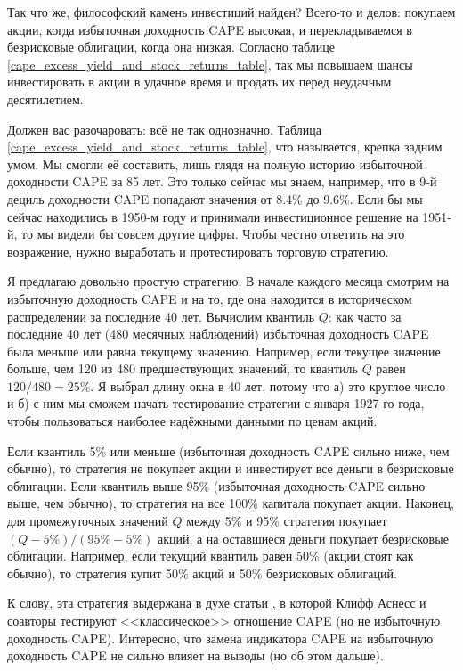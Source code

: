 Так что же, философский камень инвестиций найден? Всего-то и делов: покупаем акции, когда избыточная доходность CAPE высокая, и перекладываемся в безрисковые облигации, когда она низкая. Согласно таблице \ref{cape_excess_yield_and_stock_returns_table}, так мы повышаем шансы инвестировать в акции в удачное время и продать их перед неудачным десятилетием.

Должен вас разочаровать: всё не так однозначно. Таблица \ref{cape_excess_yield_and_stock_returns_table}, что называется, крепка задним умом. Мы смогли её составить, лишь глядя на полную историю избыточной доходности CAPE за 85 лет. Это только сейчас мы знаем, например, что в 9-й дециль доходности CAPE попадают значения от 8.4\% до 9.6\%. Если бы мы сейчас находились в 1950-м году и принимали инвестиционное решение на 1951-й, то мы видели бы совсем другие цифры. Чтобы честно ответить на это возражение, нужно выработать и протестировать торговую стратегию.

Я предлагаю довольно простую стратегию. В начале каждого месяца смотрим на избыточную доходность CAPE и на то, где она находится в историческом распределении за последние 40 лет. Вычислим квантиль $Q$: как часто за последние 40 лет (480 месячных наблюдений) избыточная доходность CAPE была меньше или равна текущему значению. Например, если текущее значение больше, чем 120 из 480 предшествующих значений, то квантиль $Q$ равен $120/480 = 25\%$. Я выбрал длину окна в 40 лет, потому что а) это круглое число и б) с ним мы сможем начать тестирование стратегии с января 1927-го года, чтобы пользоваться наиболее надёжными данными по ценам акций.

Если квантиль 5\% или меньше (избыточная доходность CAPE сильно ниже, чем обычно), то стратегия не покупает акции и инвестирует все деньги в безрисковые облигации. Если квантиль выше 95\% (избыточная доходность CAPE сильно выше, чем обычно), то стратегия на все 100\% капитала покупает акции. Наконец, для промежуточных значений $Q$ между 5\% и 95\% стратегия покупает $(Q - 5\%) / (95\% - 5\%)$ акций, а на оставшиеся деньги покупает безрисковые облигации. Например, если текущий квантиль равен 50\% (акции стоят как обычно), то стратегия купит 50\% акций и 50\% безрисковых облигаций.

К слову, эта стратегия выдержана в духе статьи \cite{asness2017market}, в которой Клифф Аснесс и соавторы тестируют <<классическое>> отношение CAPE (но не избыточную доходность CAPE). Интересно, что замена индикатора CAPE на избыточную доходность CAPE не сильно влияет на выводы (но об этом дальше).

